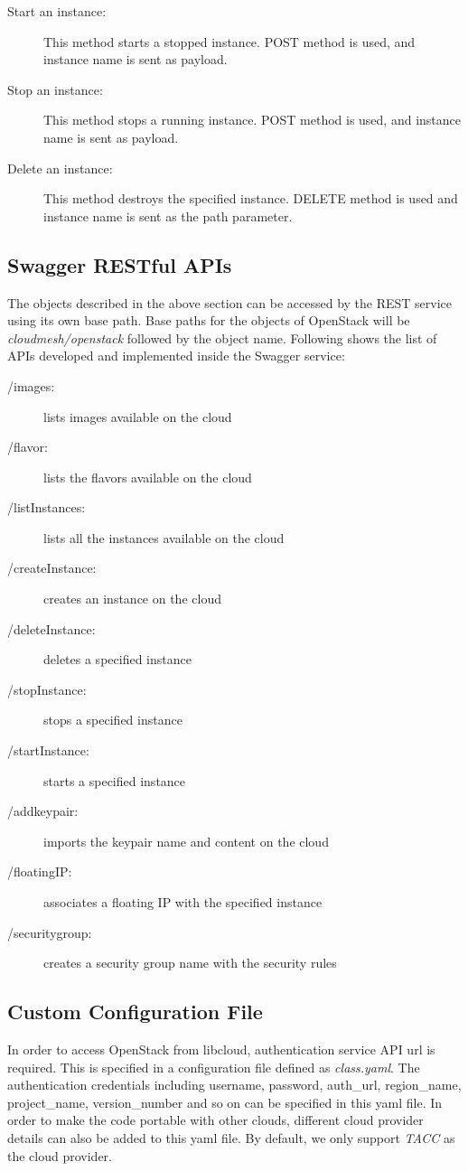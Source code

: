 \begin{description}
   \item[Start an instance:] This method starts a stopped instance.
   POST method is used, and instance name is sent as payload. 

   \item[Stop an instance:] This method stops a running instance. POST
   method is used, and instance name is sent as payload. 

   \item[Delete an instance:] This method destroys the specified
   instance. DELETE method is used and instance name is sent as the path
   parameter. 

\end{description}    

\subsection{Swagger RESTful APIs}
The objects described in the above section can be accessed by the REST service
using its own base path. Base paths for the objects of OpenStack will be
\textit{cloudmesh/openstack} followed by the object name. Following shows the
list of APIs developed and implemented inside the Swagger service:

\begin{description}
\item[/images:] lists images available on the cloud
\item[/flavor:] lists the flavors available on the cloud
\item[/listInstances:] lists all the instances available on the cloud
\item[/createInstance:] creates an instance on the cloud
\item[/deleteInstance:] deletes a specified instance
\item[/stopInstance:] stops a specified instance
\item[/startInstance:] starts a specified instance
\item[/addkeypair:] imports the keypair name and content on the cloud
\item[/floatingIP:] associates a floating IP with the specified 
instance
\item[/securitygroup:] creates a security group name with the security
rules 
\end{description}

\subsection{Custom Configuration File}
In order to access OpenStack from libcloud, authentication service API url is
required. This is specified in a configuration file defined as
\textit{class.yaml}. The authentication credentials including username,
password, auth\_url, region\_name, project\_name, version\_number and so on 
can be specified in this yaml file. In order to make the code portable with 
other clouds, different cloud provider details can also be added to this yaml 
file. By default, we only support \textit{TACC} as the cloud provider. 

